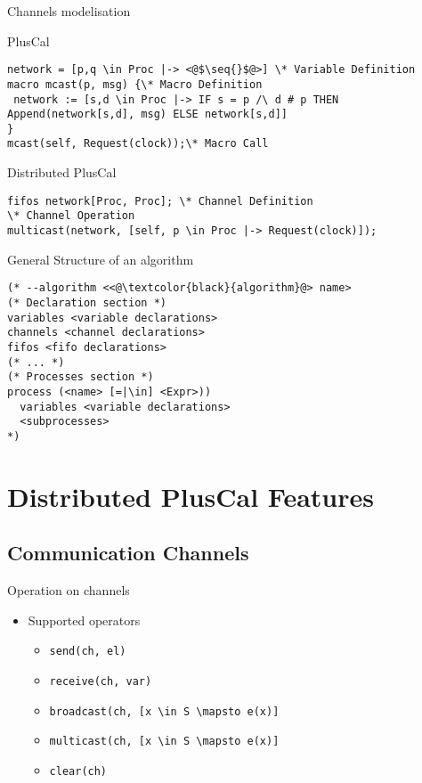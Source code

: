 \documentclass{beamer}
\newcommand{\seq}[1]{\langle #1 \rangle}
\begin{document}
\begin{frame}[fragile]{Channels modelisation}
        \begin{exampleblock}{PlusCal}
        \begin{lstlisting}[language=pluscal, frame = none, numbers = none]
network = [p,q \in Proc |-> <@$\seq{}$@>] \* Variable Definition
macro mcast(p, msg) {\* Macro Definition
 network := [s,d \in Proc |-> IF s = p /\ d # p THEN Append(network[s,d], msg) ELSE network[s,d]]
}
mcast(self, Request(clock));\* Macro Call\end{lstlisting}
    \end{exampleblock}
        \begin{exampleblock}{Distributed PlusCal}
            \begin{lstlisting}[language=pluscal, frame = none, numbers = none]
fifos network[Proc, Proc]; \* Channel Definition
\* Channel Operation
multicast(network, [self, p \in Proc |-> Request(clock)]);            \end{lstlisting}
        \end{exampleblock}
\end{frame}



\begin{frame}[fragile]{General Structure of an algorithm}
\begin{lstlisting}[language=pluscal, frame = tlrb, numbers = none]
(* --algorithm <<@\textcolor{black}{algorithm}@> name>
(* Declaration section *)
variables <variable declarations>
channels <channel declarations>
fifos <fifo declarations>
(* ... *)
(* Processes section *)
process (<name> [=|\in] <Expr>))
  variables <variable declarations>
  <subprocesses>
*)
\end{lstlisting}
\end{frame}

\section{Distributed PlusCal Features}

\subsection{Communication Channels}

\begin{frame}[fragile]{Operation on channels}
    \begin{itemize}
     \item Supported operators 
            \begin{itemize}
                \item \verb|send(ch, el)|
                \item \verb|receive(ch, var)|
                \item \verb|broadcast(ch, [x \in S \mapsto e(x)]| 
                \item \verb|multicast(ch, [x \in S \mapsto e(x)]|
                \item \verb|clear(ch)|
            \end{itemize}

    \end{itemize}
\end{frame}
\end{document}
